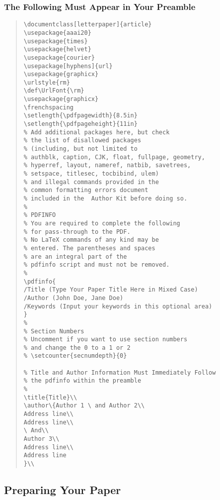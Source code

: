\documentclass[letterpaper]{article} %
\def\UrlFont{\rm}  %
\begin{document}
\subsubsection{The Following Must Appear in Your Preamble}
\begin{quote}
\begin{scriptsize}\begin{verbatim}
\documentclass[letterpaper]{article}
\usepackage{aaai20}
\usepackage{times}
\usepackage{helvet}
\usepackage{courier}
\usepackage[hyphens]{url} 
\usepackage{graphicx}
\urlstyle{rm}
\def\UrlFont{\rm}
\usepackage{graphicx}
\frenchspacing
\setlength{\pdfpagewidth}{8.5in}
\setlength{\pdfpageheight}{11in}
% Add additional packages here, but check 
% the list of disallowed packages 
% (including, but not limited to
% authblk, caption, CJK, float, fullpage, geometry, 
% hyperref, layout, nameref, natbib, savetrees, 
% setspace, titlesec, tocbibind, ulem)
% and illegal commands provided in the 
% common formatting errors document
% included in the  Author Kit before doing so. 
%
% PDFINFO
% You are required to complete the following
% for pass-through to the PDF. 
% No LaTeX commands of any kind may be
% entered. The parentheses and spaces 
% are an integral part of the 
% pdfinfo script and must not be removed.
%
\pdfinfo{
/Title (Type Your Paper Title Here in Mixed Case)
/Author (John Doe, Jane Doe)
/Keywords (Input your keywords in this optional area)
}
%
% Section Numbers
% Uncomment if you want to use section numbers
% and change the 0 to a 1 or 2
% \setcounter{secnumdepth}{0}

% Title and Author Information Must Immediately Follow
% the pdfinfo within the preamble
%
\title{Title}\\
\author\{Author 1 \ and Author 2\\
Address line\\
Address line\\
\ And\\
Author 3\\
Address line\\
Address line
}\\
\end{verbatim}\end{scriptsize}
\end{quote}

\subsection{Preparing Your Paper}
\end{document}

